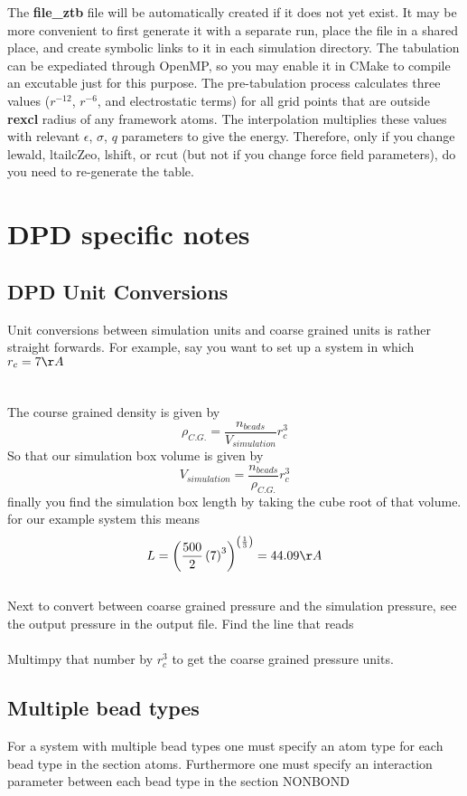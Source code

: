 \documentclass[12pt,letterpaper]{article}
\begin{document}
The \textbf{file\_ztb} file will be automatically created if
it does not yet exist. It may be more convenient to first
generate it with a separate run, place the file in a shared
place, and create symbolic links to it in each simulation
directory. The tabulation can be expediated through OpenMP,
so you may enable it in CMake to compile an excutable just
for this purpose. The pre-tabulation process calculates
three values ($r^{-12}$, $r^{-6}$, and electrostatic terms)
for all grid points that are outside \textbf{rexcl} radius
of any framework atoms. The interpolation multiplies these
values with relevant $\epsilon$, $\sigma$, $q$ parameters to
give the energy. Therefore, only if you change lewald,
ltailcZeo, lshift, or rcut (but not if you change force
field parameters), do you need to re-generate the table.
\section{DPD specific notes} \label{sec:dpdunitconversions}
\subsection{DPD Unit Conversions} 
Unit conversions between simulation units and coarse grained units is rather straight forwards. For example, say you want to set up a system in which \\ \indent $r_c = 7 \AA$ \\  \\  \\ The course grained density is given by 
\begin{equation}
\rho_{C.G.} = \frac{n_{beads}}{V_{simulation}}r_c^{3}
\end{equation}
So that our simulation box volume is given by 
\begin{equation}
V_{simulation}  = \frac{n_{beads}}{\rho_{C.G.}} r_c^3
\end{equation}
finally you find the simulation box length by taking the cube root of that volume. \\ for our example system this means
\begin{equation}
L = \left(\frac{500}{2}\left(7\right)^3\right)^{\left(\frac{1}{3}\right)}=44.09\AA
\end{equation}
\\ \indent Next to convert between coarse grained pressure and the simulation pressure, see the output pressure in the output file. Find the line that reads \\  \\ Multimpy that number by $r_c^3$ to get the coarse grained pressure units. 
\subsection{Multiple bead types}
For a system with multiple bead types one must specify an atom type for each bead type in the section atoms. Furthermore one must specify an interaction parameter between each bead type in the section NONBOND
\end{document}
